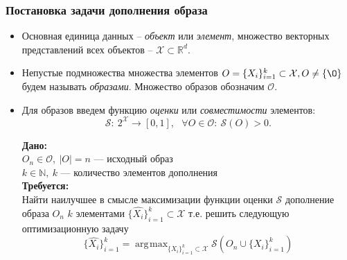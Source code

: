 \documentclass[10pt]{beamer}
\DeclareMathOperator*{\argmax}{\arg\!\max}
\begin{document}
\begin{frame}
	\frametitle{Постановка задачи дополнения образа}
			\begin{itemize}
				\item Основная единица данных -- \textit{объект} или \textit{элемент}, множество векторных представлений всех объектов -- $\mathcal{X}\subset \mathbb{R}^d$.
%				
				\item Непустые подмножества множества элементов $O = \{X_i\}_{i=1}^k\subset \mathcal{X}, O\neq\{\O\}$ будем называть \textit{образами}. Множество образов обозначим $\mathcal{O}$.
				\item Для образов введем функцию \textit{оценки} или \textit{совместимости} элементов: 
				$$\mathcal{S}:~2^\mathcal{X}\longrightarrow [0,1], ~~~\forall O \in \mathcal{O}:~\mathcal{S}(O) > 0.$$


			\textbf{Дано:}\\
			$O_n\in\mathcal{O}, ~|O| = n$ --- исходный образ \\
			$k \in \mathbb{N}, ~k$ --- количество элементов дополнения \\	
			
			\textbf{Требуется:}\\
			Найти наилучшее в смысле максимизации функции оценки $\mathcal{S}$ дополнение образа $O_n$  $k$ элементами $\{\hat{X_i}\}_{i=1}^k\subset \mathcal{X}$ т.е. решить следующую оптимизационную задачу
			$$\{\hat{X_i}\}_{i=1}^k= \argmax_{\{X_i\}_{i=1}^k\subset\mathcal{X}} \mathcal{S}\left(O_n\cup\{X_i\}_{i=1}^k\right)$$
%			
		\end{itemize}
\end{frame}
\end{document}

